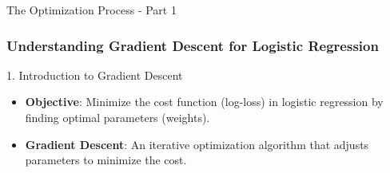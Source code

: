 \documentclass[aspectratio=169]{beamer}
\begin{document}
\begin{frame}[fragile]{The Optimization Process - Part 1}
    \frametitle{Understanding Gradient Descent for Logistic Regression}
    
    \begin{block}{1. Introduction to Gradient Descent}
        \begin{itemize}
            \item \textbf{Objective}: Minimize the cost function (log-loss) in logistic regression by finding optimal parameters (weights).
            \item \textbf{Gradient Descent}: An iterative optimization algorithm that adjusts parameters to minimize the cost.
        \end{itemize}
    \end{block}

\end{frame}
\end{document}
